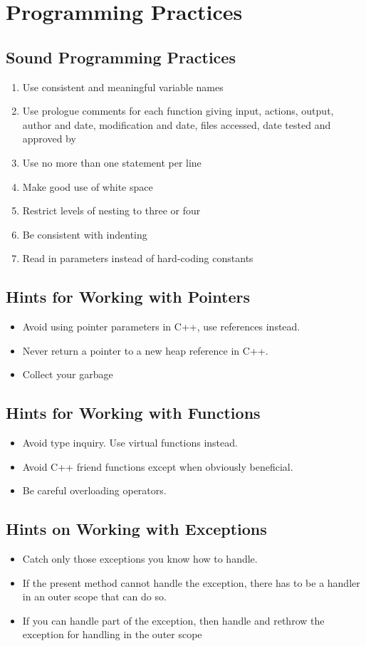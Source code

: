 \documentclass{report}
\begin{document}
		\section{Programming Practices}
			\subsection{Sound Programming Practices}
				\begin{enumerate}
					\item Use consistent and meaningful variable names
					\item Use prologue comments for each function giving input, actions, output, author and date, modification and date, files accessed, date tested and approved by
					\item Use no more than one statement per line
					\item Make good use of white space
					\item Restrict levels of nesting to three or four
					\item Be consistent with indenting
					\item Read in parameters instead of hard-coding constants
				\end{enumerate}
			\subsection{Hints for Working with Pointers}
				\begin{itemize}
					\item Avoid using pointer parameters in C++, use references instead.
					\item Never return a pointer to a new heap reference in C++.
					\item Collect your garbage
				\end{itemize}
			\subsection{Hints for Working with Functions}
				\begin{itemize}
					\item Avoid type inquiry. Use virtual functions instead.
					\item Avoid C++ friend functions except when obviously beneficial.
					\item Be careful overloading operators.
				\end{itemize}
			\subsection{Hints on Working with Exceptions}
				\begin{itemize}
					\item Catch only those exceptions you know how to handle.
					\item If the present method cannot handle the exception, there has to be a handler in an outer scope that can do so.
					\item If you can handle part of the exception, then handle and rethrow the exception for handling in the outer scope
				\end{itemize}
\end{document}
